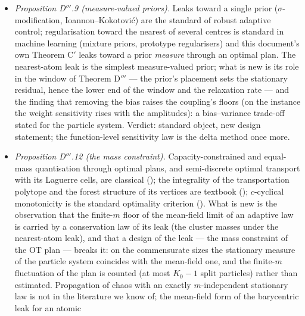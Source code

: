 \begin{itemize}
    delta-method statement (the Gaussian limit of a smooth function of a multinomial), standard in statistics; what is
    specific is its object (the shared-particle coupling of a particle approximation to a stationary $K$-atom measure,
    with the covariance $(1/m - 1/M)(\operatorname{diag}\bar w - \bar w\bar w^\T)$) and its role as the sharp form of
    the theorem's constant (stiffness$^{-1}$ $\times$ feature correlations against $\kappa^{-1}L_\vartheta^GK_\Phi$).
  \item \emph{Proposition D$'''$.9 (measure-valued priors).} Leaks toward a single prior ($\sigma$-modification,
    Ioannou--Kokotovi\'c) are the standard of robust adaptive control; regularisation toward the nearest of several
    centres is standard in machine learning (mixture priors, prototype regularisers) and this document's own
    Theorem C$'$ leaks toward a prior \emph{measure} through an optimal plan. The nearest-atom leak is the simplest
    measure-valued prior; what is new is its role in the window of Theorem D$'''$ --- the prior's placement sets the
    stationary residual, hence the lower end of the window and the relaxation rate --- and the finding that removing
    the bias raises the coupling's floors (on the instance the weight sensitivity rises with the amplitudes): a
    bias--variance trade-off stated for the particle system. Verdict: standard object, new design statement; the
    function-level sensitivity law is the delta method once more.
  \item \emph{Proposition D$'''$.12 (the mass constraint).} Capacity-constrained and equal-mass quantisation
    through optimal plans, and semi-discrete optimal transport with its Laguerre cells, are classical
    (\cite{S19,S42}); the integrality of the transportation polytope and the forest structure of its vertices are
    textbook (\cite{S40}); $c$-cyclical monotonicity is the standard optimality criterion (\cite{S41}). What is
    new is the observation that the finite-$m$ floor of the mean-field limit of an adaptive law is carried by a
    conservation law of its leak (the cluster masses under the nearest-atom leak), and that a design of the leak
    --- the mass constraint of the OT plan --- breaks it: on the commensurate sizes the stationary measure of the
    particle system coincides with the mean-field one, and the finite-$m$ fluctuation of the plan is counted (at
    most $K_0 - 1$ split particles) rather than estimated. Propagation of chaos with an exactly $m$-independent
    stationary law is not in the literature we know of; the mean-field form of the barycentric leak for an atomic

\end{itemize}

